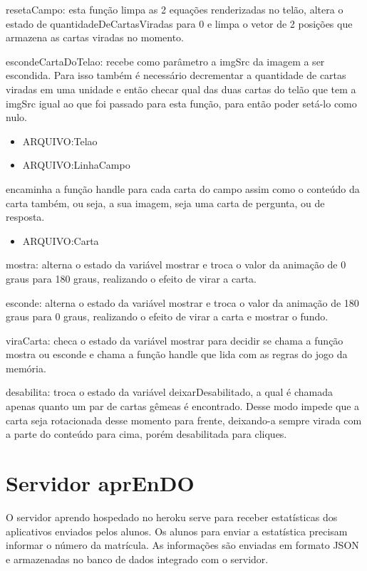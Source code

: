 resetaCampo: esta função limpa as 2 equações renderizadas no telão, altera o estado de quantidadeDeCartasViradas para 0 e limpa o vetor de 2 posições que armazena as cartas viradas no momento.

escondeCartaDoTelao: recebe como parâmetro a imgSrc da imagem a ser escondida. Para isso também é necessário decrementar a quantidade de cartas viradas em uma unidade e então checar qual das duas cartas do telão que tem a imgSrc igual ao que foi passado para esta função, para então poder setá-lo como nulo. 

\begin{itemize}
\item ARQUIVO:Telao
\end{itemize}	


\begin{itemize}
\item ARQUIVO:LinhaCampo
\end{itemize}

	encaminha a função handle para cada carta do campo assim como o conteúdo da carta também, ou seja, a sua imagem, seja uma carta de pergunta, ou de resposta.
 
\begin{itemize}
\item ARQUIVO:Carta
\end{itemize}
mostra: alterna o estado da variável mostrar e troca o valor da animação de 0 graus para 180 graus, realizando o efeito de virar a carta.

esconde: alterna o estado da variável mostrar e troca o valor da animação de 180 graus para 0 graus, realizando o efeito de virar a carta e mostrar o fundo.

viraCarta: checa o estado da variável mostrar para decidir se chama a função mostra ou esconde e chama a função handle que lida com as regras do jogo da memória.

desabilita: troca o estado da variável deixarDesabilitado, a qual é chamada apenas quanto um par de cartas gêmeas é encontrado. Desse modo impede que a carta seja rotacionada desse momento para frente, deixando-a sempre virada com a parte do conteúdo para cima, porém desabilitada para cliques.


\section[Servidor aprEnDO]{Servidor aprEnDO}
O servidor aprendo hospedado no heroku serve para receber estatísticas dos aplicativos enviados pelos alunos. Os alunos para enviar a estatística precisam informar o número da matrícula. As informações são enviadas em formato JSON e armazenadas no banco de dados integrado com o servidor.

